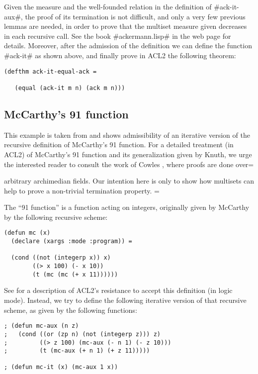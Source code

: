 \documentclass[11pt]{llncs}
\begin{document}
{Given the measure and the well-founded relation in the definition of
#ack-it-aux#, the proof of its termination is not difficult, and only a
very few previous lemmas are needed, in order to prove that the multiset
measure given decreases in each recursive call. See the book
#ackermann.lisp# in the web page for details. Moreover, after the
admission of the definition we can define the function #ack-it# as shown
above, and finally prove in ACL2 the following theorem:

\begin{verbatim}
(defthm ack-it-equal-ack =

   (equal (ack-it m n) (ack m n)))
\end{verbatim}

\subsection{McCarthy's 91 function}

This example is taken from \cite{DM-multiset} and shows admissibility of
an iterative version of the recursive definition of McCarthy's 91
function. For a detailed treatment (in ACL2) of McCarthy's 91 function
and its generalization given by Knuth, we urge the interested reader to
consult the work of Cowles \cite{CowlesKnuth}, where proofs are done over=

arbitrary archimedian fields. Our intention here is only to show how
multisets can help to prove a non-trivial termination property. =


The ``91 function'' is a function acting on integers, originally given
by McCarthy by the following recursive scheme:

\begin{verbatim}
(defun mc (x)
  (declare (xargs :mode :program)) =

  (cond ((not (integerp x)) x)
        ((> x 100) (- x 10))
        (t (mc (mc (+ x 11))))))
\end{verbatim}

See \cite{CowlesKnuth} for a description of ACL2's resistance to accept
this definition (in logic mode). Instead, we try to define the following
iterative version of that recursive scheme, as given by the
following functions:

\begin{verbatim}
; (defun mc-aux (n z)
;   (cond ((or (zp n) (not (integerp z))) z)
;         ((> z 100) (mc-aux (- n 1) (- z 10)))
;         (t (mc-aux (+ n 1) (+ z 11)))))

; (defun mc-it (x) (mc-aux 1 x))
\end{verbatim}

}
\end{document}
